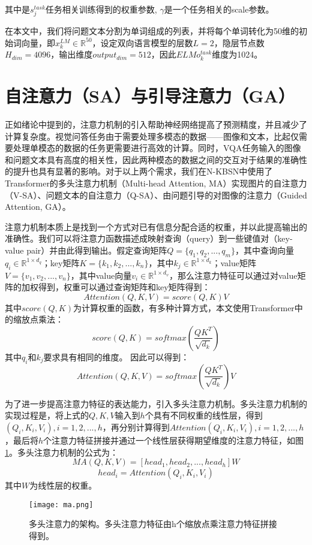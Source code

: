 其中是$s_j^{task}$任务相关训练得到的权重参数, $\gamma$是一个任务相关的scale参数。

在本文中，我们将问题文本分割为单词组成的列表，并将每个单词转化为50维的初始词向量，即$x_k^{LM}\in \mathbb{R}^{50}$，设定双向语言模型的层数$L = 2$，隐层节点数$H_{dim} = 4096$，输出维度$output_{dim} = 512$，因此$ELMo_k^{task}$维度为1024。

\section{自注意力（SA）与引导注意力（GA）}
正如绪论中提到的，注意力机制的引入帮助神经网络提高了预测精度，并且减少了计算复杂度。视觉问答任务由于需要处理多模态的数据——图像和文本，比起仅需要处理单模态的数据的任务更需要进行高效的计算。同时，VQA任务输入的图像和问题文本具有高度的相关性，因此两种模态的数据之间的交互对于结果的准确性的提升也具有显著的影响。对于以上两个需求，我们在N-KBSN中使用了Transformer的多头注意力机制（Multi-head Attention, MA）实现图片的自注意力（V-SA）、问题文本的自注意力（Q-SA）、由问题引导的对图像的注意力（Guided Attention, GA）。

注意力机制本质上是找到一个方式对已有信息分配合适的权重，并以此提高输出的准确性。我们可以将注意力函数描述成映射查询（query）到一些键值对（key-value pair）并由此得到输出。假定查询矩阵$Q = \{q_1, q_2, ..., q_m\}$，其中查询向量$q_i \in \mathbb{R}^{1 \times d_q}$；key矩阵$K = \{k_1, k_2, ..., k_n\}$，其中$k_j\in \mathbb{R}^{1 \times d_k}$；value矩阵$V = \{v_1, v_2, ..., v_n\}$，其中value向量$v_i \in \mathbb{R}^{1 \times d_v}$，那么注意力特征可以通过对value矩阵的加权得到，权重可以通过查询矩阵和key矩阵得到：
\begin{equation}
Attention(Q, K, V) = score(Q, K)V
\end{equation}
其中$score(Q, K)$为计算权重的函数，有多种计算方式，本文使用Transformer中的缩放点乘法：
\begin{equation}
score(Q, K) = softmax(\frac{QK^T}{\sqrt{d_k}})
\end{equation}
其中$q_i$和$k_j$要求具有相同的维度。
因此可以得到：
\begin{equation}
Attention(Q, K, V) = softmax(\frac{QK^T}{\sqrt{d_k}})V
\end{equation}

为了进一步提高注意力特征的表达能力，引入多头注意力机制。多头注意力机制的实现过程是，将上式的$Q, K, V$输入到$h$个具有不同权重的线性层，得到$(Q_i, K_i, V_i), i = 1, 2, ..., h$，再分别计算得到$Attention(Q_i, K_i, V_i), i = 1, 2, ..., h$，最后将$h$个注意力特征拼接并通过一个线性层获得期望维度的注意力特征，如图\ref{ma}。多头注意力机制的公式为：
\begin{equation}
MA(Q, K, V) = [head_1, head_2, ..., head_h]W
\end{equation}
\begin{equation}
head_i = Attention(Q_i, K_i, V_i)
\end{equation}
其中$W$为线性层的权重。
\begin{figure}[H]
	\texttt{[image: ma.png]}
	\caption{多头注意力的架构。多头注意力特征由h个缩放点乘注意力特征拼接得到。}
	\label{ma}
\end{figure}

